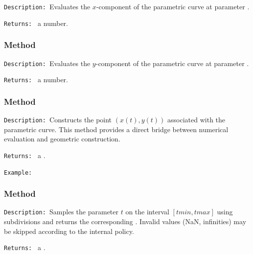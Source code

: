 \texttt{Description: }Evaluates the $x$-component of the parametric curve at
parameter .

\medskip
\texttt{Returns: } a number.

\subsubsection{Method }
\label{ssub:method_pfct_y}

\texttt{Description: }Evaluates the $y$-component of the parametric curve at
parameter .

\medskip
\texttt{Returns: } a number.

\subsubsection{Method }
\label{ssub:method_pfct_point}


\texttt{Description: }Constructs the point $(x(t),y(t))$ associated with the
parametric curve. This method provides a direct bridge between numerical
evaluation and geometric construction.

\medskip
\texttt{Returns: } a .

\medskip
\texttt{Example: }
\begin{tkzexample}[latex=.5\textwidth]
\begin{center}
 \end{center}
\end{tkzexample}

\subsubsection{Method }
\label{ssub:method_pfct_path}

\texttt{Description: }Samples the parameter $t$ on the interval
$[tmin,tmax]$ using  subdivisions and returns the corresponding
. Invalid values (NaN, infinities) may be skipped according to
the internal policy.

\texttt{Returns: } a .

